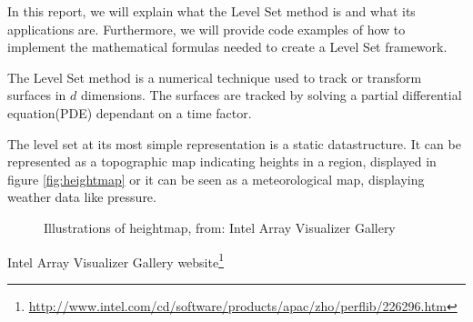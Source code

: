 In this report, we will explain what the Level Set method is and what
its applications are. Furthermore, we will provide code examples of
how to implement the mathematical formulas needed to create a Level
Set framework.

The Level Set method is a numerical technique used to track or
transform surfaces in $d$ dimensions. The surfaces are tracked by
solving a partial differential equation(PDE) dependant on a time factor.

The level set at its most simple representation is a static
datastructure. It can be represented as a topographic map indicating
heights in a region, displayed in figure
\vref{fig:heightmap} or it can be seen as a
meteorological map, displaying weather data like pressure.

\begin{figure}[h]
\begin{center}
\end{center}
\caption{Illustrations of heightmap, from: Intel Array Visualizer Gallery}
\label{fig:heightmap}
\end{figure}

Intel Array Visualizer Gallery website\footnote{\url{http://www.intel.com/cd/software/products/apac/zho/perflib/226296.htm}}

